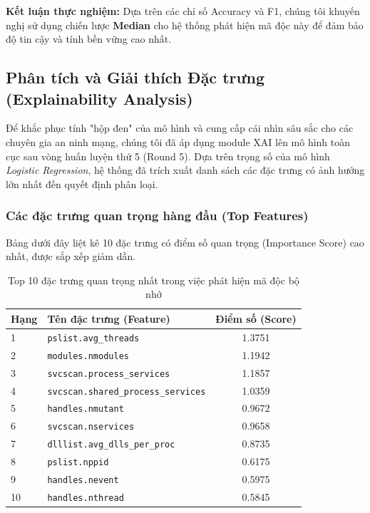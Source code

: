 \textbf{Kết luận thực nghiệm:} Dựa trên các chỉ số Accuracy và F1, chúng tôi khuyến nghị sử dụng chiến lược \textbf{Median} cho hệ thống phát hiện mã độc này để đảm bảo độ tin cậy và tính bền vững cao nhất.

\subsection{Phân tích và Giải thích Đặc trưng (Explainability Analysis)}

Để khắc phục tính "hộp đen" của mô hình và cung cấp cái nhìn sâu sắc cho các chuyên gia an ninh mạng, chúng tôi đã áp dụng module XAI lên mô hình toàn cục sau vòng huấn luyện thứ 5 (Round 5). Dựa trên trọng số của mô hình \textit{Logistic Regression}, hệ thống đã trích xuất danh sách các đặc trưng có ảnh hưởng lớn nhất đến quyết định phân loại.

\subsubsection{Các đặc trưng quan trọng hàng đầu (Top Features)}
Bảng dưới đây liệt kê 10 đặc trưng có điểm số quan trọng (Importance Score) cao nhất, được sắp xếp giảm dần.

\begin{table}[ht!]
\centering
\caption{Top 10 đặc trưng quan trọng nhất trong việc phát hiện mã độc bộ nhớ}
\label{tab:feature_importance}
\begin{tabular}{|l|l|c|}
\hline
\textbf{Hạng} & \textbf{Tên đặc trưng (Feature)} & \textbf{Điểm số (Score)} \\ \hline
1 & \texttt{pslist.avg\_threads} & 1.3751 \\ \hline
2 & \texttt{modules.nmodules} & 1.1942 \\ \hline
3 & \texttt{svcscan.process\_services} & 1.1857 \\ \hline
4 & \texttt{svcscan.shared\_process\_services} & 1.0359 \\ \hline
5 & \texttt{handles.nmutant} & 0.9672 \\ \hline
6 & \texttt{svcscan.nservices} & 0.9658 \\ \hline
7 & \texttt{dlllist.avg\_dlls\_per\_proc} & 0.8735 \\ \hline
8 & \texttt{pslist.nppid} & 0.6175 \\ \hline
9 & \texttt{handles.nevent} & 0.5975 \\ \hline
10 & \texttt{handles.nthread} & 0.5845 \\ \hline
\end{tabular}
\end{table}

